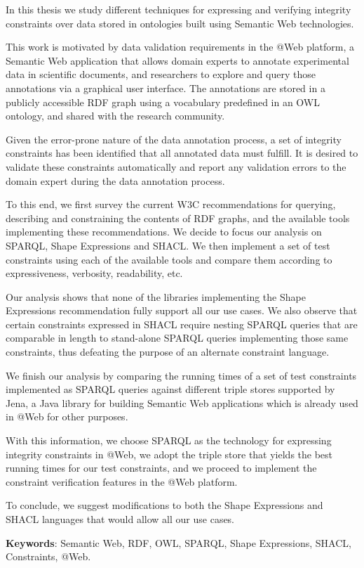 \documentclass[a4paper, 10pt]{article}
\begin{document}
In this thesis we study different techniques for expressing and verifying
integrity constraints over data stored in ontologies built using Semantic Web
technologies.

This work is motivated by data validation requirements in the @Web platform, a
Semantic Web application that allows domain experts to annotate experimental
data in scientific documents, and researchers to explore and query those
annotations via a graphical user interface. The annotations are stored in a
publicly accessible RDF graph using a vocabulary predefined in an OWL ontology,
and shared with the research community.

Given the error-prone nature of the data annotation process, a set of integrity
constraints has been identified that all annotated data must fulfill. It is
desired to validate these constraints automatically and report any validation
errors to the domain expert during the data annotation process.

To this end, we first survey the current W3C recommendations for querying,
describing and constraining the contents of RDF graphs, and the available tools
implementing these recommendations. We decide to focus our analysis on SPARQL,
Shape Expressions and SHACL. We then implement a set of test constraints using
each of the available tools and compare them according to expressiveness,
verbosity, readability, etc.

Our analysis shows that none of the libraries implementing the Shape
Expressions recommendation fully support all our use cases. We also observe
that certain constraints expressed in SHACL require nesting SPARQL queries that
are comparable in length to stand-alone SPARQL queries implementing those same
constraints, thus defeating the purpose of an alternate constraint language.

We finish our analysis by comparing the running times of a set of test
constraints implemented as SPARQL queries against different triple stores
supported by Jena, a Java library for building Semantic Web applications which
is already used in @Web for other purposes.

With this information, we choose SPARQL as the technology for expressing
integrity constraints in @Web, we adopt the triple store that yields the best
running times for our test constraints, and we proceed to implement the
constraint verification features in the @Web platform.

To conclude, we suggest modifications to both the Shape Expressions and SHACL
languages that would allow all our use cases.

\textbf{Keywords}: Semantic Web, RDF, OWL, SPARQL, Shape Expressions, SHACL,
Constraints, @Web.
\end{document}
